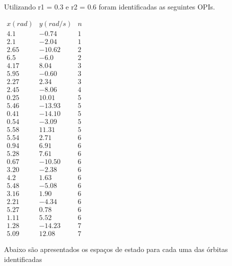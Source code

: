 

Utilizando r1 = 0.3 e r2 = 0.6 foram identificadas as seguintes OPIs.
\\

\begin{center}
$\begin{array}{ccc}
	x(rad)        & y(rad/s)      & n \\  
	4.1  & -0.74  &  1\\ 
	2.1  & -2.04  &  1\\ 
	2.65 & -10.62 &  2\\ 
	6.5  & -6.0   &  2\\ 
	4.17 &  8.04  &  3\\ 
	5.95 & -0.60  &  3\\ 
	2.27 &  2.34  &  3\\ 
	2.45 & -8.06  &  4\\ 
	0.25 &  10.01 &  5\\ 
	5.46 & -13.93 &  5\\ 
	0.41 & -14.10 &  5\\ 
	0.54 &  -3.09 &  5\\ 
	5.58 &  11.31 &  5\\ 
	5.54 &  2.71  &  6\\ 
	0.94 &  6.91  &  6\\ 
	5.28 &  7.61  &  6\\ 
	0.67 &  -10.50&  6\\ 
	3.20 &  -2.38 &  6\\ 
	4.2  &  1.63  &  6\\ 
	5.48 &  -5.08 &  6\\ 
	3.16 &  1.90  &  6\\ 
	2.21 &  -4.34 &  6\\ 
	5.27 &  0.78  &  6\\ 
	1.11 &  5.52  &  6\\ 
	1.28 &  -14.23&  7\\ 
	5.09 &  12.08 &  7
\end{array}$ 
\end{center}


Abaixo são apresentados os espaços de estado para cada uma das órbitas identificadas
\\



